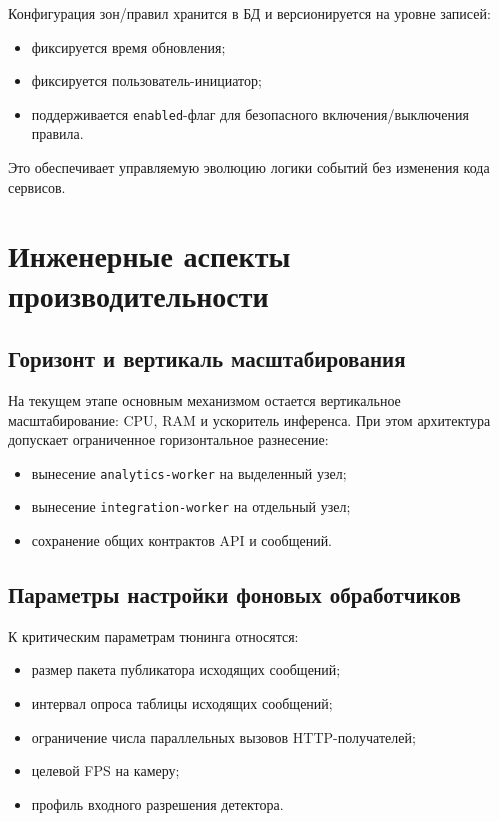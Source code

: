Конфигурация зон/правил хранится в БД и версионируется на уровне записей:
\begin{itemize}
    \item фиксируется время обновления;
    \item фиксируется пользователь-инициатор;
    \item поддерживается \texttt{enabled}-флаг для безопасного включения/выключения правила.
\end{itemize}

Это обеспечивает управляемую эволюцию логики событий без изменения кода сервисов.

\section{Инженерные аспекты производительности}

\subsection{Горизонт и вертикаль масштабирования}

На текущем этапе основным механизмом остается вертикальное масштабирование: CPU, RAM и ускоритель инференса. При этом архитектура допускает ограниченное горизонтальное разнесение:
\begin{itemize}
    \item вынесение \texttt{analytics-worker} на выделенный узел;
    \item вынесение \texttt{integration-worker} на отдельный узел;
    \item сохранение общих контрактов API и сообщений.
\end{itemize}

\subsection{Параметры настройки фоновых обработчиков}

К критическим параметрам тюнинга относятся:
\begin{itemize}
    \item размер пакета публикатора исходящих сообщений;
    \item интервал опроса таблицы исходящих сообщений;
    \item ограничение числа параллельных вызовов HTTP-получателей;
    \item целевой FPS на камеру;
    \item профиль входного разрешения детектора.
\end{itemize}

